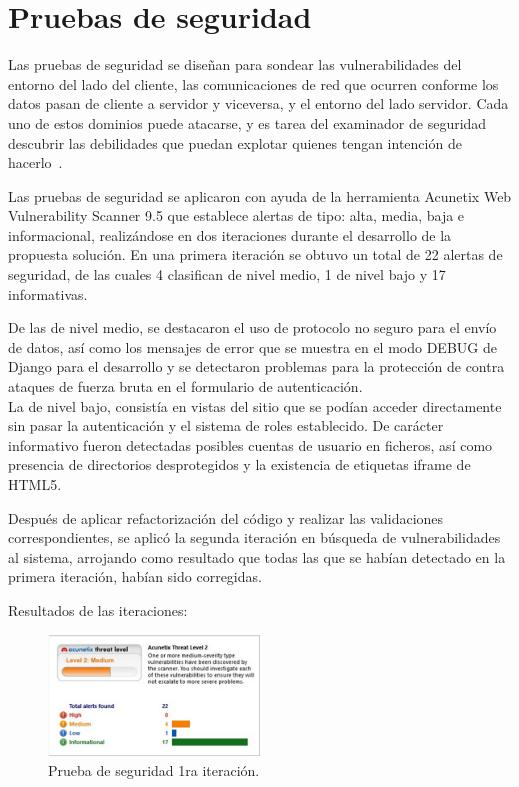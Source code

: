 \section{Pruebas de seguridad}

Las pruebas de seguridad se diseñan para sondear las vulnerabilidades del entorno del lado del cliente, las
comunicaciones de red que ocurren conforme los datos pasan de cliente a servidor y viceversa, y el entorno
del lado servidor. Cada uno de estos dominios puede atacarse, y es tarea del examinador de seguridad
descubrir las debilidades que puedan explotar quienes tengan intención de hacerlo~\cite{pressman2010practitioner}.

Las pruebas de seguridad se aplicaron con ayuda de la herramienta Acunetix Web Vulnerability Scanner 9.5
que establece alertas de tipo: alta, media, baja e informacional, realizándose en dos iteraciones durante el
desarrollo de la propuesta solución.
En una primera iteración se obtuvo un total de 22 alertas de seguridad, de las cuales 4 clasifican de nivel
medio, 1 de nivel bajo y 17 informativas.

De las de nivel medio, se destacaron el uso de protocolo no seguro
para el envío de datos, así como los mensajes de error que se muestra en el modo DEBUG de Django para
el desarrollo y se detectaron problemas para la protección de contra ataques de fuerza bruta en el formulario
de autenticación.\\
La de nivel bajo, consistía en vistas del sitio que se podían acceder directamente sin pasar la autenticación
y el sistema de roles establecido. De carácter informativo fueron detectadas posibles cuentas de usuario en ficheros, así como presencia de directorios desprotegidos y la existencia de etiquetas iframe de HTML5.

Después de aplicar refactorización del código y realizar las validaciones correspondientes, se aplicó la segunda iteración en búsqueda de vulnerabilidades al sistema, arrojando como resultado que todas las que se habían detectado en la primera iteración, habían sido corregidas.

Resultados de las iteraciones: 

\begin{figure}[htbp] %
	\centering
	\includegraphics[width=0.5\textwidth]{images/primeraIt.PNG} 
	\caption{ Prueba de seguridad 1ra iteración.}
	\label{fig:grafica_segur}
\end{figure}

